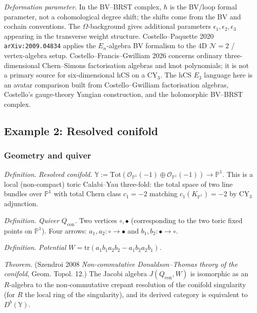 \emph{Deformation parameter.} In the BV--BRST complex, $\hbar$ is the
BV/loop formal parameter, not a cohomological degree shift; the shifts
come from the BV and cochain conventions.  The $\Omega$-background gives
additional parameters $\epsilon_1,\epsilon_2,\epsilon_3$ appearing in the
transverse weight structure. Costello--Paquette 2020
\texttt{arXiv:2009.04834} applies the $E_n$-algebra BV formalism to the
4D $\mathcal{N}=2$ / vertex-algebra setup.  Costello--Francis--Gwilliam
2026 concerns ordinary three-dimensional Chern--Simons factorisation
algebras and knot polynomials; it is not a primary source for
six-dimensional hCS on a CY$_3$.  The hCS $E_3$ language here is an
avatar comparison built from Costello--Gwilliam factorisation algebras,
Costello's gauge-theory Yangian construction, and the holomorphic
BV--BRST complex.

\subsection{Example 2: Resolved conifold}
\label{wn:subsec:resolved-conifold}

\subsubsection{Geometry and quiver}

\emph{Definition.} \emph{Resolved conifold.}
$\mathbb{Y} := \mathrm{Tot}(\mathcal{O}_{\mathbb{P}^1}(-1) \oplus \mathcal{O}_{\mathbb{P}^1}(-1)) \to \mathbb{P}^1$.
This is a local (non-compact) toric Calabi--Yau three-fold: the total space of two
line bundles over $\mathbb{P}^1$ with total Chern class $c_1 = -2$ matching
$c_1(K_{\mathbb{P}^1}) = -2$ by CY$_3$ adjunction.

\emph{Definition.} \emph{Quiver $Q_{\mathrm{con}}$.}
Two vertices $\circ, \bullet$ (corresponding to the two toric fixed points on $\mathbb{P}^1$).
Four arrows: $a_1, a_2: \circ \to \bullet$ and $b_1, b_2: \bullet \to \circ$.

\emph{Definition.} \emph{Potential $W = \mathrm{tr}(a_1 b_1 a_2 b_2 - a_1 b_2 a_2 b_1)$.}

\emph{Theorem.} (Szendroi 2008 \emph{Non-commutative Donaldson--Thomas theory of
the conifold}, Geom. Topol. 12.) The Jacobi algebra $J(Q_{\mathrm{con}}, W)$ is isomorphic
as an $R$-algebra to the non-commutative crepant resolution of the conifold singularity
(for $R$ the local ring of the singularity), and its derived category is equivalent to
$D^b(\mathbb{Y})$.


